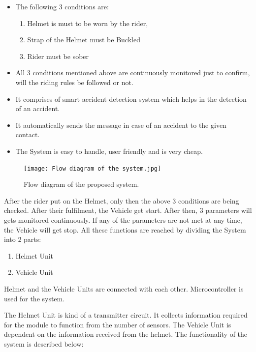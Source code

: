 \begin{itemize}
	\item The following 3 conditions are:\vspace{.3cm}
	
	\begin{enumerate}
		\item 	Helmet is must to be worn by the rider,
		\item 	Strap of the Helmet must be Buckled
		\item 	Rider must be sober
	\end{enumerate}
	\item  All 3 conditions mentioned above are continuously monitored just to confirm, will the riding rules be followed or not.
	\item It comprises of smart accident detection system which helps in the detection of an accident.
	\item  It automatically sends the message in case of an accident to the given contact.
	\item  The System is easy to handle, user friendly and is very cheap.	
\end{itemize}

\begin{figure}[h]
	\centering
	\texttt{[image: Flow diagram of the system.jpg]}
	\captionsetup{labelformat=empty}
	\caption[]{Flow diagram of the proposed system.}
\end{figure}\vspace{.3cm}

After the rider put on the Helmet, only then the above 3 conditions are being checked. After their fulfilment, the Vehicle get start. After then, 3 parameters will gets monitored continuously. If any of the parameters are not met at any time, the Vehicle will get stop. All these functions are reached by dividing the System into 2 parts:

\begin{enumerate}
	\item 	Helmet Unit
	\item	Vehicle Unit
\end{enumerate}

Helmet and the Vehicle Units are connected with each other. Microcontroller is used for the system.\vspace{.3cm}

The Helmet Unit is kind of a transmitter circuit. It collects information required for the module to function from the number of sensors. The Vehicle Unit is dependent on the information received from the helmet. The functionality of the system is described below:

